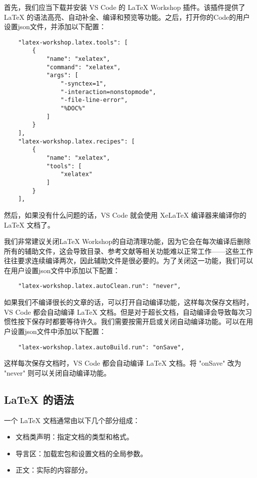 \documentclass[../main.tex]{subfiles}
\begin{document}
首先，我们应当下载并安装 VS Code 的 LaTeX Workshop 插件。该插件提供了 LaTeX 的语法高亮、自动补全、编译和预览等功能。之后，打开你的Code的用户设置json文件，并添加以下配置：

\begin{lstlisting}
    "latex-workshop.latex.tools": [
        {
            "name": "xelatex",
            "command": "xelatex",
            "args": [
                "-synctex=1",
                "-interaction=nonstopmode",
                "-file-line-error",
                "%DOC%"
            ]
        }
    ],
    "latex-workshop.latex.recipes": [
        {
            "name": "xelatex",
            "tools": [
                "xelatex"
            ]
        }
    ],
\end{lstlisting}

然后，如果没有什么问题的话，VS Code 就会使用 XeLaTeX 编译器来编译你的 LaTeX 文档了。

我们非常建议关闭LaTeX Workshop的自动清理功能，因为它会在每次编译后删除所有的辅助文件，这会导致目录、参考文献等相关功能难以正常工作——这些工作往往要求连续编译两次，因此辅助文件是很必要的。为了关闭这一功能，我们可以在用户设置json文件中添加以下配置：
\begin{lstlisting}
    "latex-workshop.latex.autoClean.run": "never",
\end{lstlisting}

如果我们不编译很长的文章的话，可以打开自动编译功能，这样每次保存文档时，VS Code 都会自动编译 LaTeX 文档。但是对于超长文档，自动编译会导致每次习惯性按下保存时都要等待许久。我们需要按需开启或关闭自动编译功能。可以在用户设置json文件中添加以下配置：
\begin{lstlisting}
    "latex-workshop.latex.autoBuild.run": "onSave",
\end{lstlisting}
这样每次保存文档时，VS Code 都会自动编译 LaTeX 文档。将 "onSave" 改为 "never" 则可以关闭自动编译功能。

\subsection{LaTeX 的语法}

一个 LaTeX 文档通常由以下几个部分组成：
\begin{itemize}
  \item 文档类声明：指定文档的类型和格式。
  \item 导言区：加载宏包和设置文档的全局参数。
  \item 正文：实际的内容部分。
\end{itemize}
\end{document}
